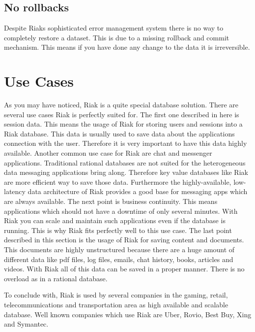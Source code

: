  \subsection{No rollbacks}
 Despite Riaks sophisticated error management system there is no way to completely restore a dataset. This is due to a missing rollback and commit mechanism. This means if you have done any change to the data it is irreversible.  
 \newpage
 \section{Use Cases}
 As you may have noticed, Riak is a quite special database solution. There are several use cases Riak is perfectly suited for. The first one described in here is session data. This means the usage of Riak for storing users and sessions into a Riak database. This data is usually used to save data about the applications connection with the user. Therefore it is very important to have this data highly available.
 Another common use case for Riak are chat and messenger applications. Traditional rational databases are not suited for the heterogeneous data messaging applications bring along. Therefore key value databases like Riak are more efficient way to save those data. Furthermore the highly-available, low-latency data architecture of Riak provides a good base for messaging apps which are always available.
 The next point is business continuity. This means applications which should not have a downtime of only several minutes. With Riak you can scale and maintain such applications even if the database is running. This is why Riak fits perfectly well to this use case.
 The last point described in this section is the usage of Riak for saving content and documents. This documents are highly unstructured because there are a huge amount of different data like pdf files, log files, emails, chat history, books, articles and videos. With Riak all of this data can be saved in a proper manner. There is no overload  as in a rational database. \cite{Basho.01.04.17}  
 
 To conclude with, Riak is used by several companies in the gaming, retail, telecommunications and transportation area as high available and scalable database. Well known companies which use Riak are Uber, Rovio, Best Buy, Xing and Symantec. \cite{Basho.01.04.17b}
 
 \newpage